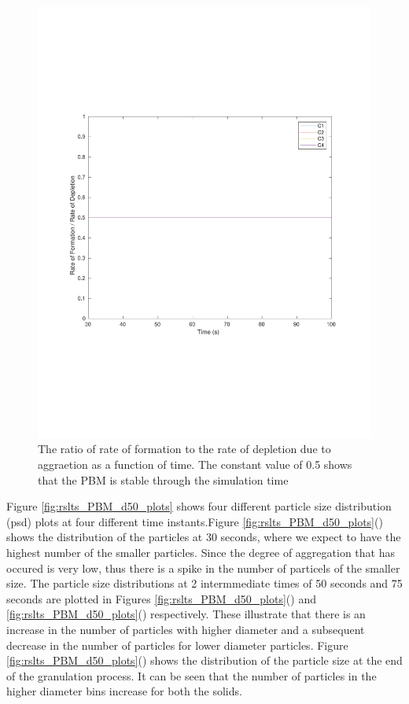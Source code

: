 \documentclass[preprint,11pt,authoryear]{elsarticle}
\begin{document}
\begin{figure}[H]
\begin{center}
\includegraphics[scale=0.5]{rslts_PBM_2mm_validation.pdf}
\caption{The ratio of rate of formation to the rate of depletion due to aggraetion as a function of time. The constant value of 0.5 shows that the PBM is stable through the simulation time}
\label{fig:rslts_PBM_ratio_plot_2mm}
\end{center}
\end{figure}
Figure \ref{fig:rslts_PBM_d50_plots} shows four different particle size distribution (psd) plots at four different time instants.Figure \ref{fig:rslts_PBM_d50_plots}() shows the distribution of the particles at 30 seconds, where we expect to have the highest number of the smaller particles. Since the degree of aggregation that has occured is very low, thus there is a spike in the number of particels of the smaller size. The particle size distributions at 2 intermmediate times of 50 seconds and 75 seconds are plotted in Figures \ref{fig:rslts_PBM_d50_plots}() and \ref{fig:rslts_PBM_d50_plots}() respectively. These illustrate that there is an increase in the number of particles with higher diameter and a subsequent decrease in the number of particles for lower diameter particles. Figure \ref{fig:rslts_PBM_d50_plots}() shows the distribution of the particle size at the end of the granulation process. It can be seen that the number of particles in the higher diameter bins increase for both the solids. 
\end{document}
